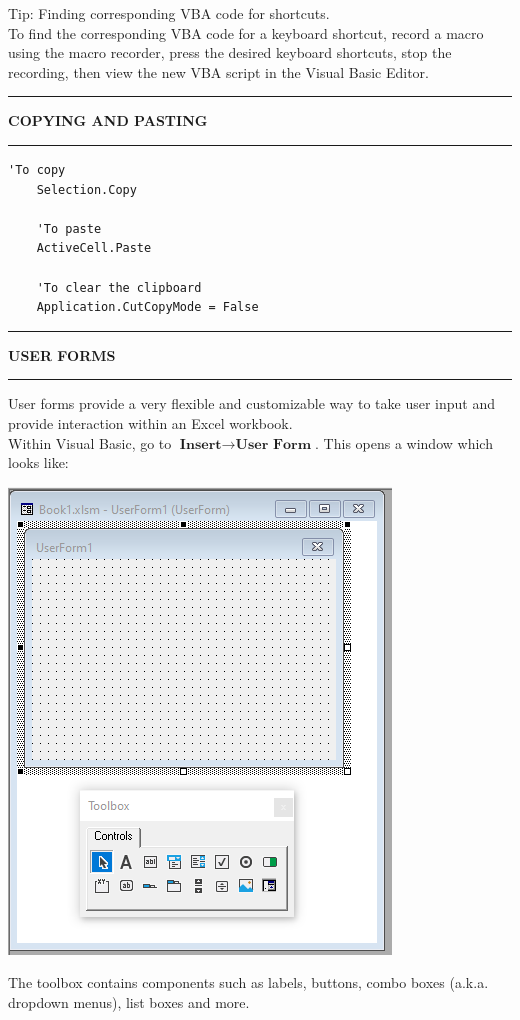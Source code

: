 \documentclass[8pt]{extarticle}
\newcommand{\heading}[1]{%
    \noindent
    \rule{\linewidth}{0.4pt}
    \begin{center}
        \vspace{-1ex}
        \textbf{#1}        
        \vspace{-2.5ex}
    \end{center}
    \rule{\linewidth}{0.4pt}
}
\begin{document}
\begin{multicols}{3}
\begin{tcolorbox}[colback=gray!10, colframe=gray!50]
Tip: Finding corresponding VBA code for shortcuts.\\

To find the corresponding VBA code for a keyboard shortcut, record a macro using the macro recorder, press the desired keyboard shortcuts, stop the recording, then view the new VBA script in the Visual Basic Editor. 
\end{tcolorbox}

\heading{COPYING AND PASTING}

\begin{lstlisting}[style=vba]
    'To copy
    Selection.Copy
    
    'To paste
    ActiveCell.Paste
    
    'To clear the clipboard
    Application.CutCopyMode = False
\end{lstlisting}

\columnbreak
\heading{USER FORMS}

User forms provide a very flexible and customizable way to take user input and provide interaction within an Excel workbook. \\

Within Visual Basic, go to $\textbf{Insert} \rightarrow \textbf{User Form}$. This opens a window which looks like:
\begin{center}
    \includegraphics[width=0.6\columnwidth]{images/UserForm.png}
\end{center}
The toolbox contains components such as labels, buttons, combo boxes (a.k.a. dropdown menus), list boxes and more. \\


\end{multicols}
\end{document}
